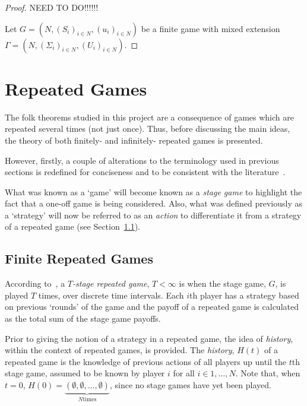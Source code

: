 \begin{proof}
    NEED TO DO!!!!!!

    Let \(G=(N, (S_{i})_{i \in N}, (u_{i})_{i \in N})\) be a finite game with
    mixed extension \(\Gamma=(N, (\Sigma_{i})_{i \in N}, (U_{i})_{i \in N})\). 
    
\end{proof}

\section{Repeated Games}\label{sec:Repeated_Games}
The folk theorems studied in this project are a consequence of games which are
repeated several times (not just once). Thus, before discussing the main ideas,
the theory of both finitely- and infinitely- repeated games is presented.

However, firstly, a couple of alterations to the terminology used in
previous sections is redefined for conciseness and to be consistent with the literature~\cite{}.

What was known as a `game' will become known as a \emph{stage game} to highlight
the fact that a one-off game is being considered. Also, what was defined
previously as a `strategy' will now be referred to as an \emph{action} to
differentiate it from a strategy of a repeated game (see
Section~\ref{subsec:Finite_Repeated_Games}).

\subsection{Finite Repeated Games}\label{subsec:Finite_Repeated_Games}
According to~\cite{Knight2017a}, a \textit{\(T\)-stage repeated game}, \(T <
\infty\) is when the stage game, \(G\), is played \(T\) times, over discrete
time intervals. Each \(i\)th player has a strategy based on previous `rounds' of
the game and the payoff of a repeated game is calculated as the total sum of the
stage game payoffs.

Prior to giving the notion of a strategy in a repeated game, the idea of 
\emph{history}, within the context of repeated games, is provided.
The \textit{history}, \(H(t)\) of a repeated game is the knowledge of previous
actions of all players up until the \(t\)th stage game, assumed to be known by
player \(i\) for all \(i \in 1, \ldots, N\). Note that, when \(t=0\), \(H(0) =
\underbrace{(\emptyset, \emptyset, \ldots, \emptyset)}_{N \text{times}}\), since
no stage games have yet been played.

